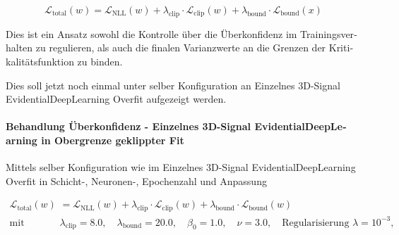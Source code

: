 \begin{otherlanguage}{ngerman}
\begin{equation}
\mathcal{L}_{\text{total}}(w) = \mathcal{L}_{\text{NLL}}(w) + \lambda_{\text{clip}} \cdot \mathcal{L}_{\text{clip}}(w) + \lambda_{\text{bound}} \cdot \mathcal{L}_{\text{bound}}(x)
\end{equation}

Dies ist ein Ansatz sowohl die Kontrolle über die Überkonfidenz im Trainingsverhalten zu regulieren, als auch die finalen Varianzwerte an die Grenzen der Kritikalitätsfunktion zu binden.

Dies soll jetzt noch einmal unter selber Konfiguration an \glqq{}Einzelnes 3D-Signal \gls{EvidentialDeepLearning} Overfit\grqq{} aufgezeigt werden.



\paragraph{Behandlung Überkonfidenz - \glqq{}Einzelnes 3D-Signal \gls{EvidentialDeepLearning} in Obergrenze geklippter Fit\grqq{}}

Mittels selber Konfiguration wie im \glqq{}Einzelnes 3D-Signal \gls{EvidentialDeepLearning} Overfit\grqq{} in Schicht-, Neuronen-, Epochenzahl und Anpassung 

\begin{align*}
\mathcal{L}_{\text{total}}(w) &= 
\mathcal{L}_{\text{NLL}}(w) 
+ \lambda_{\text{clip}} \cdot \mathcal{L}_{\text{clip}}(w) 
+ \lambda_{\text{bound}} \cdot \mathcal{L}_{\text{bound}}(w)
\\
\text{mit} \quad 
&\lambda_{\text{clip}} = 8.0, \quad 
\lambda_{\text{bound}} = 20.0, \quad 
\beta_0 = 1.0, \quad 
\nu = 3.0, \quad 
\text{Regularisierung } \lambda = 10^{-3},
\end{align*}


\end{otherlanguage}
